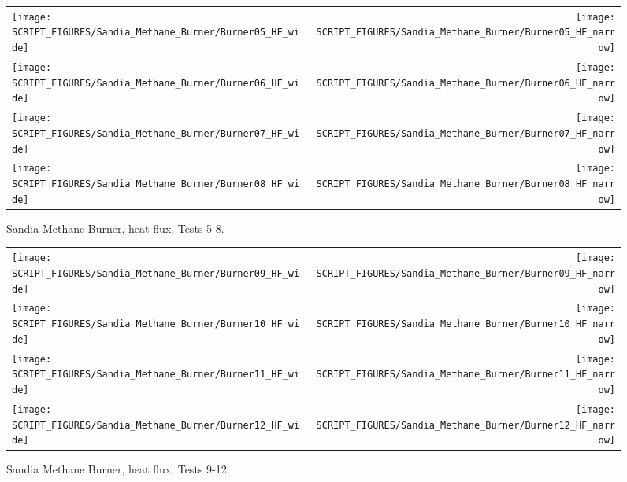 \begin{figure}[p]
\begin{tabular*}{\textwidth}{l@{\extracolsep{\fill}}r}
\texttt{[image: SCRIPT\_FIGURES/Sandia\_Methane\_Burner/Burner05\_HF\_wide]} &
\texttt{[image: SCRIPT\_FIGURES/Sandia\_Methane\_Burner/Burner05\_HF\_narrow]} \\
\texttt{[image: SCRIPT\_FIGURES/Sandia\_Methane\_Burner/Burner06\_HF\_wide]} &
\texttt{[image: SCRIPT\_FIGURES/Sandia\_Methane\_Burner/Burner06\_HF\_narrow]} \\
\texttt{[image: SCRIPT\_FIGURES/Sandia\_Methane\_Burner/Burner07\_HF\_wide]} &
\texttt{[image: SCRIPT\_FIGURES/Sandia\_Methane\_Burner/Burner07\_HF\_narrow]} \\
\texttt{[image: SCRIPT\_FIGURES/Sandia\_Methane\_Burner/Burner08\_HF\_wide]} &
\texttt{[image: SCRIPT\_FIGURES/Sandia\_Methane\_Burner/Burner08\_HF\_narrow]}
\end{tabular*}
\caption[Sandia Methane Burner, heat flux, Tests 5-8] {Sandia Methane Burner, heat flux, Tests 5-8.}
\label{Sandia_Methane_Burner_HF_2}
\end{figure}

\begin{figure}[p]
\begin{tabular*}{\textwidth}{l@{\extracolsep{\fill}}r}
\texttt{[image: SCRIPT\_FIGURES/Sandia\_Methane\_Burner/Burner09\_HF\_wide]} &
\texttt{[image: SCRIPT\_FIGURES/Sandia\_Methane\_Burner/Burner09\_HF\_narrow]} \\
\texttt{[image: SCRIPT\_FIGURES/Sandia\_Methane\_Burner/Burner10\_HF\_wide]} &
\texttt{[image: SCRIPT\_FIGURES/Sandia\_Methane\_Burner/Burner10\_HF\_narrow]} \\
\texttt{[image: SCRIPT\_FIGURES/Sandia\_Methane\_Burner/Burner11\_HF\_wide]} &
\texttt{[image: SCRIPT\_FIGURES/Sandia\_Methane\_Burner/Burner11\_HF\_narrow]} \\
\texttt{[image: SCRIPT\_FIGURES/Sandia\_Methane\_Burner/Burner12\_HF\_wide]} &
\texttt{[image: SCRIPT\_FIGURES/Sandia\_Methane\_Burner/Burner12\_HF\_narrow]}
\end{tabular*}
\caption[Sandia Methane Burner, heat flux, Tests 9-12] {Sandia Methane Burner, heat flux, Tests 9-12.}
\label{Sandia_Methane_Burner_HF_3}
\end{figure}

